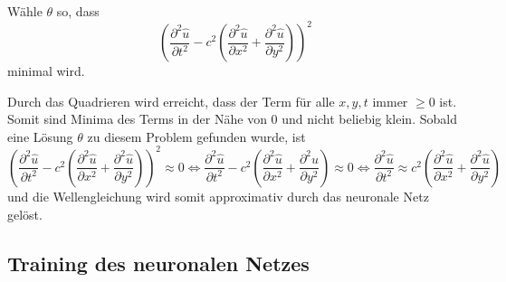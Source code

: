 Wähle \( \theta \) so, dass
\begin{equation}
    \left(\frac{\partial^2 \hat{u}}{\partial t^2} - c^2 \left( \frac{\partial^2 \hat{u}}{\partial x^2} + \frac{\partial^2 \hat{u}}{\partial y^2} \right)\right)^2
    \label{neuronal:optimierung}
\end{equation}
minimal wird.\newline

Durch das Quadrieren wird erreicht, dass der Term für alle \( x, y, t \) immer \( \geq 0 \) ist.
Somit sind Minima des Terms in der Nähe von 0 und nicht beliebig klein.
Sobald eine Lösung \( \theta \) zu diesem Problem gefunden wurde, ist
\begin{equation}
    \left(\frac{\partial^2 \hat{u}}{\partial t^2} - c^2 \left( \frac{\partial^2 \hat{u}}{\partial x^2} + \frac{\partial^2 \hat{u}}{\partial y^2} \right)\right)^2 \approx 0
    \iff
    \frac{\partial^2 \hat{u}}{\partial t^2} - c^2 \left( \frac{\partial^2 \hat{u}}{\partial x^2} + \frac{\partial^2 \hat{u}}{\partial y^2} \right) \approx 0
    \iff
    \frac{\partial^2 \hat{u}}{\partial t^2} \approx c^2 \left( \frac{\partial^2 \hat{u}}{\partial x^2} + \frac{\partial^2 \hat{u}}{\partial y^2} \right)
\end{equation}
und die Wellengleichung wird somit approximativ durch das neuronale Netz gelöst.


\subsection{Training des neuronalen Netzes}\label{neuronal:subsection:training_nn}

